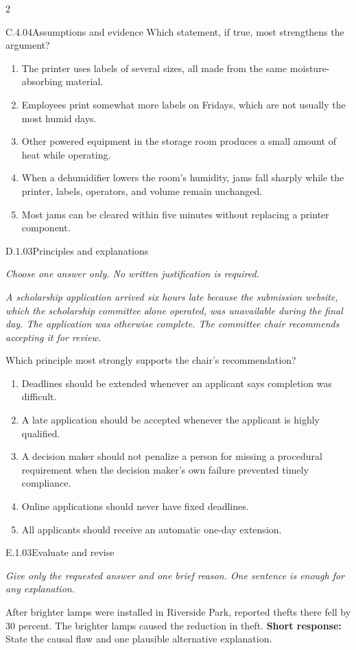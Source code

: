 \documentclass[9pt]{extarticle}
\newcommand{\choice}[1]{\item #1}
\begin{document}
\begin{multicols}{2}
\begin{DenseCoreProblem}{C.4.04}{Assumptions and evidence}
Which statement, if true, most strengthens the argument?
\begin{enumerate}[label=(\alph*)]
  \choice{The printer uses labels of several sizes, all made from the same moisture-absorbing material.}
  \choice{Employees print somewhat more labels on Fridays, which are not usually the most humid days.}
  \choice{Other powered equipment in the storage room produces a small amount of heat while operating.}
  \choice{When a dehumidifier lowers the room's humidity, jams fall sharply while the printer, labels, operators, and volume remain unchanged.}
  \choice{Most jams can be cleared within five minutes without replacing a printer component.}
\end{enumerate}
\end{DenseCoreProblem}
\begin{DenseCoreProblem}{D.1.03}{Principles and explanations}
{\scriptsize\textit{Choose one answer only. No written justification is required.}\par}
\emph{A scholarship application arrived six hours late because the submission website, which the scholarship committee alone operated, was unavailable during the final day. The application was otherwise complete. The committee chair recommends accepting it for review.}

Which principle most strongly supports the chair's recommendation?
\begin{enumerate}[label=(\alph*)]
  \choice{Deadlines should be extended whenever an applicant says completion was difficult.}
  \choice{A late application should be accepted whenever the applicant is highly qualified.}
  \choice{A decision maker should not penalize a person for missing a procedural requirement when the decision maker's own failure prevented timely compliance.}
  \choice{Online applications should never have fixed deadlines.}
  \choice{All applicants should receive an automatic one-day extension.}
\end{enumerate}
\end{DenseCoreProblem}
\begin{DenseCoreProblem}{E.1.03}{Evaluate and revise}
{\scriptsize\textit{Give only the requested answer and one brief reason. One sentence is enough for any explanation.}\par}
After brighter lamps were installed in Riverside Park, reported thefts there fell by 30 percent. The brighter lamps caused the reduction in theft.
\textbf{Short response:} State the causal flaw and one plausible alternative explanation.
\end{DenseCoreProblem}
\end{multicols}
\end{document}
